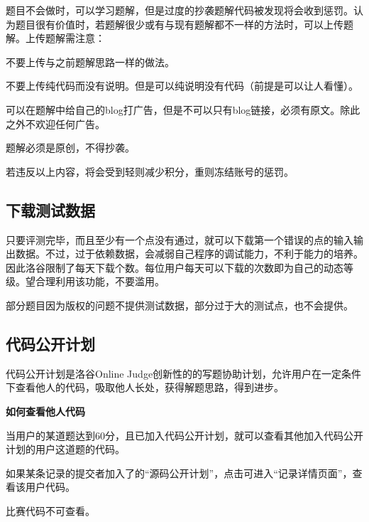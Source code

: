 \documentclass[10pt,a4paper]{article}
\begin{document}
		
		题目不会做时，可以学习题解，但是过度的抄袭题解代码被发现将会收到惩罚。认为题目很有价值时，若题解很少或有与现有题解都不一样的方法时，可以上传题解。上传题解需注意：
		\begin{itemize}{
				\item 
				
				不要上传与之前题解思路一样的做法。
				\item 
				
				
				不要上传纯代码而没有说明。但是可以纯说明没有代码（前提是可以让人看懂）。
				\item 
				
				
				可以在题解中给自己的blog打广告，但是不可以只有blog链接，必须有原文。除此之外不欢迎任何广告。
				\item 
				
				题解必须是原创，不得抄袭。
				\item 若违反以上内容，将会受到轻则减少积分，重则冻结账号的惩罚。}
		\end{itemize}
		
		\subsection{
			下载测试数据}
		
		
		只要评测完毕，而且至少有一个点没有通过，就可以下载第一个错误的点的输入输出数据。不过，过于依赖数据，会减弱自己程序的调试能力，不利于能力的培养。因此洛谷限制了每天下载个数。每位用户每天可以下载的次数即为自己的动态等级。望合理利用该功能，不要滥用。
		
		
		部分题目因为版权的问题不提供测试数据，部分过于大的测试点，也不会提供。
		
		\subsection{
			代码公开计划}
		
		
		代码公开计划是洛谷Online Judge创新性的的写题协助计划，允许用户在一定条件下查看他人的代码，吸取他人长处，获得解题思路，得到进步。
		
		\textbf{{
				如何查看他人代码}}
		\begin{itemize}{
				\item 
				
				
				当用户的某道题达到60分，且已加入代码公开计划，就可以查看其他加入代码公开计划的用户这道题的代码。
				\item 
				
				
				如果某条记录的提交者加入了的“源码公开计划”，点击可进入“记录详情页面”，查看该用户代码。
				\item 比赛代码不可查看。}
		\end{itemize}
		
\end{document}
